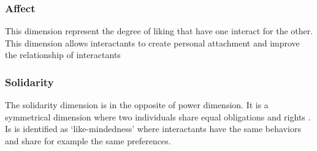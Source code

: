 \documentclass{llncs}
\begin{document}
\subsubsection{Affect}
This dimension represent the degree of liking that have one interact for the other. This dimension allows interactants to create personal attachment and improve the relationship of interactants \cite{nicholson2001role}
\subsubsection{Solidarity}
The solidarity dimension is in the opposite of power dimension. It is a symmetrical dimension where two individuals share equal obligations and rights \cite{svennevig2000getting}. Is is identified as ‘like-mindedness’ \cite{bickmore2005establishing} where interactants have the same behaviors and share for example the same preferences.
\end{document}
